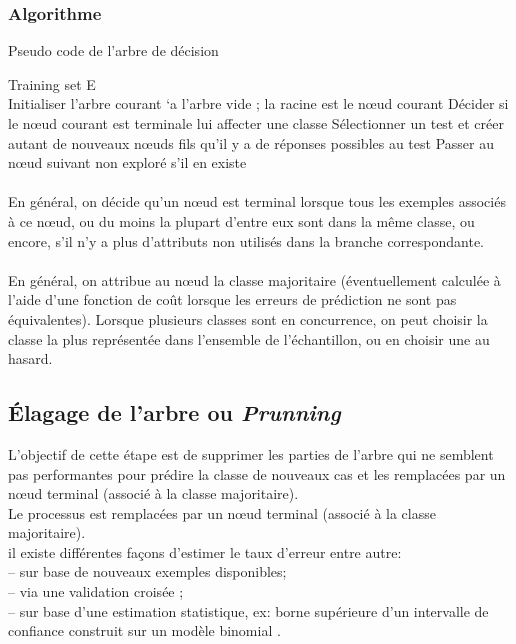\subsubsection{Algorithme}
\begin{algorithm}
	\caption{Pseudo code de l'arbre de décision}
	\begin{algorithmic}
		\Require 
		Training set E \\
		\State Initialiser l’arbre courant `a l’arbre vide ; la racine est le nœud courant
	    \State Décider si le nœud courant est terminale
	    \State lui affecter une classe 
	    \Else 
	    \State Sélectionner un test et créer autant de nouveaux nœuds fils qu’il y a de réponses possibles au test
	    \EndIf
	    \State Passer au nœud suivant non exploré s’il en existe
	    \EndWhile
		\end{algorithmic}
		\end{algorithm}
\paragraph{}
En général, on décide qu’un nœud est terminal lorsque tous les exemples associés à ce nœud, ou du moins la plupart d’entre eux sont dans la même classe, ou encore, s’il n’y a plus d’attributs non utilisés dans la branche correspondante.
\paragraph{}
En général, on attribue au nœud la classe majoritaire (éventuellement calculée à l’aide d’une fonction de coût lorsque les erreurs de prédiction ne sont pas équivalentes). Lorsque plusieurs classes sont en concurrence, on peut choisir la classe la plus représentée dans l’ensemble de l’échantillon, ou en choisir une au hasard.
\subsection{Élagage de l'arbre ou \emph{Prunning}}
L'objectif de cette étape est de supprimer les parties de l'arbre qui ne semblent pas performantes pour
prédire la classe de nouveaux cas et les remplacées par un nœud terminal (associé à la classe majoritaire).\\
Le processus est remplacées par un nœud terminal (associé à la classe majoritaire).\\
il existe différentes façons d'estimer le taux d'erreur entre autre: \\
– sur base de nouveaux exemples disponibles;\\
– via une validation croisée ;\\
– sur base d'une estimation statistique, ex: borne supérieure d'un intervalle de confiance construit sur un modèle binomial .
